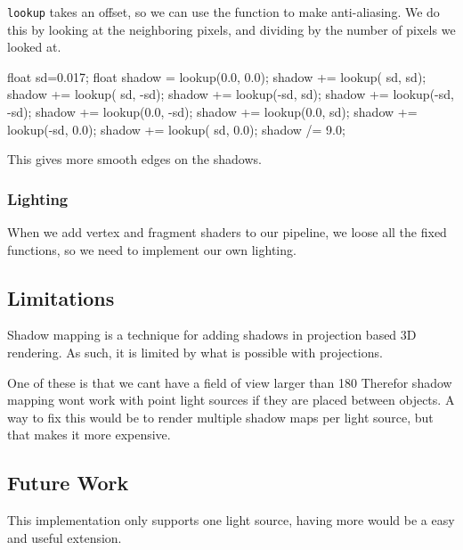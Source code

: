 \texttt{lookup} takes an offset, so we can use the function to make
anti-aliasing. We do this by looking at the neighboring pixels, and
dividing by the number of pixels we looked at.

\begin{cppcode}
    float sd=0.017;
    float shadow = lookup(0.0, 0.0);
    shadow += lookup( sd,  sd);
    shadow += lookup( sd, -sd);
    shadow += lookup(-sd,  sd);
    shadow += lookup(-sd, -sd);
    shadow += lookup(0.0, -sd);
    shadow += lookup(0.0,  sd);
    shadow += lookup(-sd, 0.0);
    shadow += lookup( sd, 0.0);
    shadow /= 9.0;
\end{cppcode}

This gives more smooth edges on the shadows.

\subsubsection*{Lighting}

When we add vertex and fragment shaders to our pipeline, we loose all
the fixed functions, so we need to implement our own lighting. 


\subsection{Limitations}

Shadow mapping is a technique for adding shadows in projection based 
3D rendering. As such, it is limited by what is possible with projections.

One of these is that we cant have a field of view larger than 180
Therefor shadow mapping wont work with point light sources if they are
placed between objects. A way to fix this would be to render multiple
shadow maps per light source, but that makes it more expensive.


\subsection{Future Work}

This implementation only supports one light source, having more would
be a easy and useful extension.



